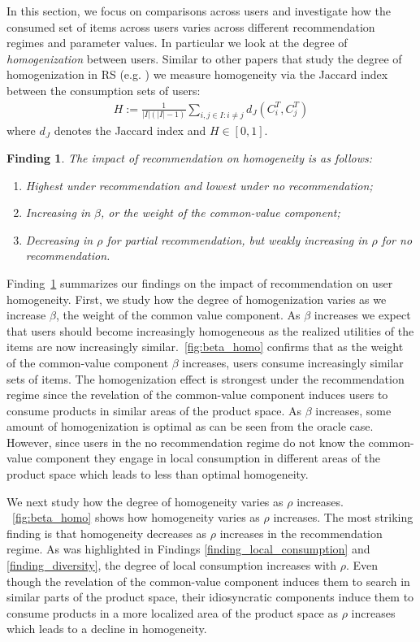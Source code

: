 \documentclass[manuscript]{acmart}
\newtheorem{finding}{Finding}
\begin{document}
In this section, we focus on comparisons across users and investigate how the consumed set of items across users varies across different recommendation regimes and parameter values. In particular we look at the degree of \textit{homogenization} between users. Similar to other papers that study the degree of homogenization in RS (e.g. \cite{chaney2018algorithmic}) we measure homogeneity via the Jaccard index between the consumption sets of users:
\begin{align*}
H:=\frac{1}{|I|(|I|-1)}\sum_{i,j \in I: i \ne j}d_J(C_i^T,C_j^T)
\end{align*}
where $d_J$ denotes the Jaccard index and $H \in [0,1]$.
\begin{finding}\label{finding_homogeneity}
The impact of recommendation on homogeneity is as follows:
\begin{enumerate}
\item Highest under recommendation and lowest under no recommendation;
\item Increasing in $\beta$, or the weight of the common-value component;
\item Decreasing in $\rho$ for partial recommendation, but weakly increasing in $\rho$ for no recommendation.
\end{enumerate}
\end{finding}
Finding~\ref{finding_homogeneity} summarizes our findings on the impact of recommendation on user homogeneity. First, we study how the degree of homogenization varies as we increase $\beta$, the weight of the common value component. As $\beta$ increases we expect that users should become increasingly homogeneous as the realized utilities of the items are now increasingly similar.~\autoref{fig:beta_homo} confirms that as the weight of the common-value component $\beta$ increases, users consume increasingly similar sets of items. The homogenization effect is strongest under the recommendation regime since the revelation of the common-value component induces users to consume products in similar areas of the product space. As $\beta$ increases, some amount of homogenization is optimal as can be seen from the oracle case. However, since users in the no recommendation regime do not know the common-value component they engage in local consumption in different areas of the product space which leads to less than optimal homogeneity.
\par
We next study how the degree of homogeneity varies as $\rho$ increases. ~\autoref{fig:beta_homo} shows how homogeneity varies as $\rho$ increases. The most striking finding is that homogeneity decreases as $\rho$ increases in the recommendation regime. As was highlighted in Findings \ref{finding_local_consumption} and \ref{finding_diversity}, the degree of local consumption increases with $\rho$. Even though the revelation of the common-value component induces them to search in similar parts of the product space, their idiosyncratic components induce them to consume products in a more localized area of the product space as $\rho$ increases which leads to a decline in homogeneity.
\end{document}
